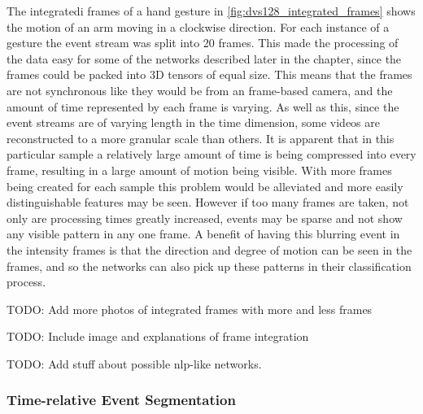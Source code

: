 The integratedi frames of a hand gesture in \cref{fig:dvs128_integrated_frames} shows the motion of an arm moving in a clockwise direction. For each instance of a gesture the event stream was split into 20 frames. This made the processing of the data easy for some of the networks described later in the chapter, since the frames could be packed into 3D tensors of equal size. This means that the frames are not synchronous like they would be from an frame-based camera, and the amount of time represented by each frame is varying. As well as this, since the event streams are of varying length in the time dimension, some videos are reconstructed to a more granular scale than others. It is apparent that in this particular sample a relatively large amount of time is being compressed into every frame, resulting in a large amount of motion being visible. With more frames being created for each sample this problem would be alleviated and more easily distinguishable features may be seen. However if too many frames are taken, not only are processing times greatly increased, events may be sparse and not show any visible pattern in any one frame. A benefit of having this blurring event in the intensity frames is that the direction and degree of motion can be seen in the frames, and so the networks can also pick up these patterns in their classification process.

\color{red} TODO: Add more photos of integrated frames with more and less frames \color{black}

\color{red} TODO: Include image and explanations of frame integration \color{black}

\color{red} TODO: Add stuff about possible nlp-like networks. \color{black}

\subsubsection{Time-relative Event Segmentation}

